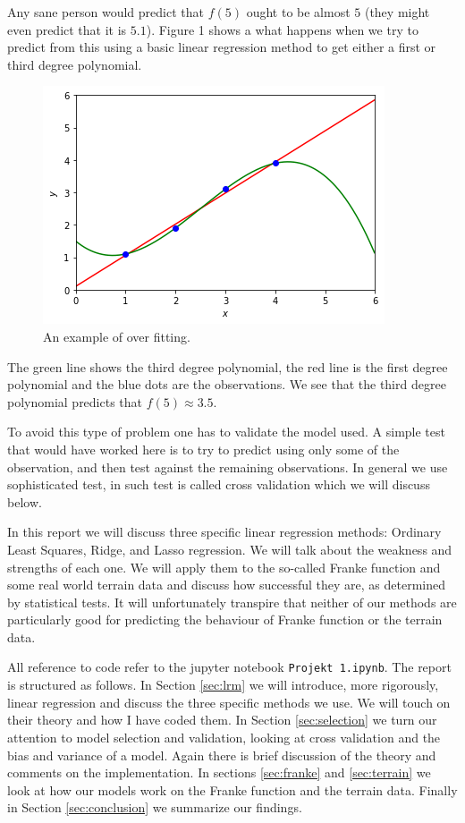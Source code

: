 \documentclass[parskip=half]{scrartcl}
\theoremstyle{definition}
\theoremstyle{remark}
\begin{document}
Any sane person would predict that $f(5)$ ought to be almost $5$ (they might even predict that it is $5.1$). 
Figure 1 shows a what happens when we try to predict from this using a basic linear regression method to get either a first or third degree polynomial.

\begin{figure}[H]
\caption{An example of over fitting.}
\centering
\includegraphics[scale=0.5]{overfitting.png}
\end{figure}

The green line shows the third degree polynomial, the red line is the first degree polynomial and the blue dots are the observations. 
We see that the third degree polynomial predicts that $f(5) \approx 3.5$. 

To avoid this type of problem one has to validate the model used.
A simple test that would have worked here is to try to predict using only some of the observation, and then test against the remaining observations.
In general we use sophisticated test, in such test is called cross validation which we will discuss below.   

In this report we will discuss three specific linear regression methods: Ordinary Least Squares, Ridge, and Lasso regression.
We will talk about the weakness and strengths of each one. 
We will apply them to the so-called Franke function and some real world terrain data and discuss how successful they are, as determined by statistical tests.
It will unfortunately transpire that neither of our methods are particularly good for predicting the behaviour of Franke function or the terrain data.
 
All reference to code refer to the jupyter notebook \texttt{Projekt 1.ipynb}.
The report is structured as follows. 
In Section \ref{sec:lrm} we will introduce, more rigorously, linear regression and discuss the three specific methods we use. 
We will touch on their theory and how I have coded them.
In Section \ref{sec:selection} we turn our attention to model selection and validation, looking at cross validation and the bias and variance of a model. 
Again there is brief discussion of the theory and comments on the implementation. 
In sections \ref{sec:franke} and \ref{sec:terrain} we look at how our models work on the Franke function and the terrain data. 
Finally in Section \ref{sec:conclusion} we summarize our findings. 
\end{document}
